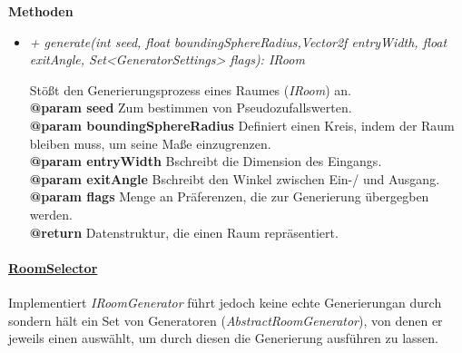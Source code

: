             \textbf{Methoden}					
            \begin{itemize}
                \item  \textit{+ generate(int seed, float boundingSphereRadius,Vector2f entryWidth, float exitAngle, Set<GeneratorSettings> flags): IRoom}
                    \begin{leftbar}[0.9\linewidth]
                        Stößt den Generierungsprozess eines Raumes (\textit{IRoom}) an.\\
                        \textbf{@param seed} Zum bestimmen von Pseudozufallswerten.\\
                        \textbf{@param boundingSphereRadius} Definiert einen Kreis, indem der Raum bleiben muss, um seine Maße einzugrenzen.\\
                        \textbf{@param entryWidth} Bschreibt die Dimension des Eingangs.\\
                        \textbf{@param exitAngle} Bschreibt den Winkel zwischen Ein-/ und Ausgang.\\
                        \textbf{@param flags} Menge an Präferenzen, die zur Generierung übergegben werden.\\
                        \textbf{@return} Datenstruktur, die einen Raum repräsentiert.
                    \end{leftbar}   
            \end{itemize}
            
        
        
        \paragraph{\underline{RoomSelector}} \mbox{}\par
            Implementiert \textit{IRoomGenerator} führt jedoch keine echte Generierungan durch sondern hält ein Set von Generatoren (\textit{AbstractRoomGenerator}),
            von denen er jeweils einen auswählt, um durch diesen die Generierung ausführen zu lassen.\par
            
